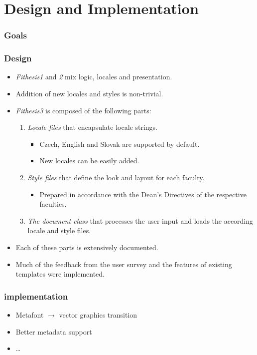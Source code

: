 \documentclass[12pt]{article}
\def\pkg#1{{\sf#1}}
\let\pkg\emph
\begin{document}
\section{Design and Implementation}
\begin{frame}
  \frametitle{Goals}
\end{frame}
\begin{frame}
  \frametitle{Design}
  \begin{itemize}[<+->]
    \item \pkg{Fithesis1} and \pkg{2} mix logic, locales and
      presentation.
    \item Addition of new locales and styles is non-trivial.
    \item \pkg{Fithesis3} is composed of the following parts:
      \begin{enumerate}
        \item\emph{Locale files} that encapsulate locale strings.
          \begin{itemize}
            \item Czech, English and Slovak are supported by
              default.
            \item New locales can be easily added.
          \end{itemize}
        \item\emph{Style files} that define the look and layout for
            each faculty.
          \begin{itemize}
            \item Prepared in accordance with the Dean's Directives
              of the respective faculties.
          \end{itemize}
        \item\emph{The document class} that processes the user
          input and loads the according locale and style files.
      \end{enumerate}
    \item Each of these parts is extensively documented.
    \item Much of the feedback from the user survey and the
      features of existing templates were implemented.
  \end{itemize}
\end{frame}
\begin{frame}
  \frametitle{implementation}
  \begin{itemize}[<+->]
    \item Metafont $\rightarrow$ vector graphics transition
    \item Better metadata support
    \item \ldots
  \end{itemize}
\end{frame}
\end{document}
